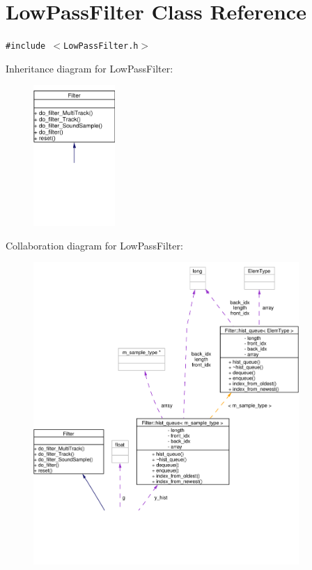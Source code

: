 \hypertarget{classLowPassFilter}{
\section{Low\-Pass\-Filter Class Reference}
\label{classLowPassFilter}
}
{\tt \#include $<$Low\-Pass\-Filter.h$>$}

Inheritance diagram for Low\-Pass\-Filter:\begin{figure}[H]
\begin{center}
\leavevmode
\includegraphics[width=88pt]{classLowPassFilter__inherit__graph}
\end{center}
\end{figure}
Collaboration diagram for Low\-Pass\-Filter:\begin{figure}[H]
\begin{center}
\leavevmode
\includegraphics[width=286pt]{classLowPassFilter__coll__graph}
\end{center}
\end{figure}
